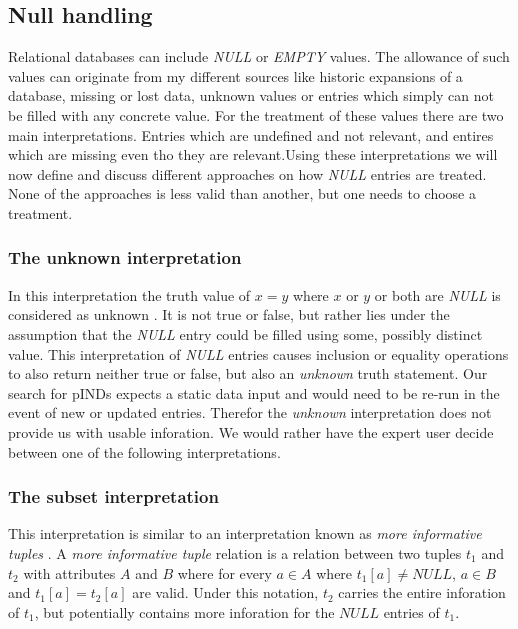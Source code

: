 \subsection{Null handling}
Relational databases can include \textit{NULL} or \textit{EMPTY} values.
The allowance of such values can originate from my different sources like historic expansions of a database, missing or lost data, unknown values or entries which simply can not be filled with any concrete value. For the treatment of these values there are two main interpretations. %
Entries which are undefined and not relevant, and entires which are missing even tho they are relevant.Using these interpretations we will now define and discuss different approaches on how \textit{NULL} entries are treated. None of the approaches is less valid than another, but one needs to choose a treatment.

\subsubsection*{The \textbf{unknown} interpretation}
In this interpretation the truth value of $x = y$ where $x$ or $y$ or both are \textit{NULL} is considered as unknown \cite{codd1979extending}.
It is not true or false, but rather lies under the assumption that the \textit{NULL} entry could be filled using some,
possibly distinct value. This interpretation of \textit{NULL} entries causes inclusion or equality operations to also
return neither true or false, but also an \textit{unknown} truth statement.
Our search for pINDs expects a static data input and would need to be re-run in the event of new or updated entries.
Therefor the \textit{unknown} interpretation does not provide us with usable inforation. We would rather have the
expert user decide between one of the following interpretations.

\subsubsection*{The \textbf{subset} interpretation}\label{sec:null_subset}
This interpretation is similar to an interpretation known as \textit{more informative tuples} \cite{zaniolo1982database}.
A \textit{more informative tuple} relation is a relation between two tuples $t_1$ and $t_2$ with attributes $A$ and $B$
where for every $a \in A$ where $t_1[a] \not = NULL$, $a \in B$ and $t_1[a] = t_2[a]$ are valid. Under this notation,
$t_2$ carries the entire inforation of $t_1$, but potentially contains more inforation for the $NULL$ entries of $t_1$.

